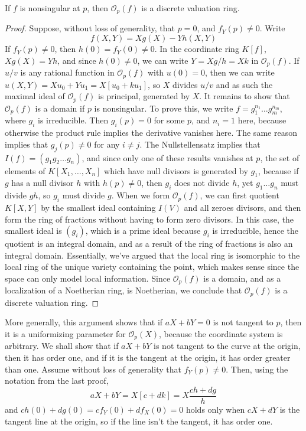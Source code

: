 \begin{theorem}
    If $f$ is nonsingular at $p$, then $\mathcal{O}_p(f)$ is a discrete valuation ring.
\end{theorem}
\begin{proof}
    Suppose, without loss of generality, that $p = 0$, and $f_Y(p) \neq 0$. Write
    \[ f(X,Y) = Xg(X) - Yh(X,Y) \]
    If $f_Y(p) \neq 0$, then $h(0) = f_Y(0) \neq 0$. In the coordinate ring $K[f]$, $Xg(X) = Yh$, and since $h(0) \neq 0$, we can write $Y = Xg/h = Xk$ in $\mathcal{O}_p(f)$. If $u/v$ is any rational function in $\mathcal{O}_p(f)$ with $u(0) = 0$, then we can write $u(X,Y) = Xu_0 + Yu_1 = X[u_0 + ku_1]$, so $X$ divides $u/v$ and as such the maximal ideal of $\mathcal{O}_p(f)$ is principal, generated by $X$. It remains to show that $\mathcal{O}_p(f)$ is a domain if $p$ is nonsingular. To prove this, we write $f = g_1^{n_1} \dots g_m^{n_m}$, where $g_i$ is irreducible. Then $g_i(p) = 0$ for some $p$, and $n_i = 1$ here, because otherwise the product rule implies the derivative vanishes here. The same reason implies that $g_j(p) \neq 0$ for any $i \neq j$. The Nullstellensatz implies that $I(f) = (g_1 g_2 \dots g_n)$, and since only one of these results vanishes at $p$, the set of elements of $K[X_1, \dots, X_n]$ which have null divisors is generated by $g_1$, because if $g$ has a null divisor $h$ with $h(p) \neq 0$, then $g_i$ does not divide $h$, yet $g_1 \dots g_n$ must divide $gh$, so $g_i$ must divide $g$. When we form $\mathcal{O}_p(f)$, we can first quotient $K[X,Y]$ by the smallest ideal containing $I(V)$ and all zeroes divisors, and then form the ring of fractions without having to form zero divisors. In this case, the smallest ideal is $(g_i)$, which is a prime ideal because $g_i$ is irreducible, hence the quotient is an integral domain, and as a result of the ring of fractions is also an integral domain. Essentially, we've argued that the local ring is isomorphic to the local ring of the unique variety containing the point, which  makes sense since the space can only model local information. Since $\mathcal{O}_p(f)$ is a domain, and as a localization of a Noetherian ring, is Noetherian, we conclude that $\mathcal{O}_p(f)$ is a discrete valuation ring.
\end{proof}

\begin{example}
    More generally, this argument shows that if $aX + bY = 0$ is not tangent to $p$, then it is a uniformizing parameter for $\mathcal{O}_p(X)$, because the coordinate system is arbitrary. We shall show that if $aX + bY$ is not tangent to the curve at the origin, then it has order one, and if it is the tangent at the origin, it has order greater than one. Assume without loss of generality that $f_Y(p) \neq 0$. Then, using the notation from the last proof,
    \[ aX + bY = X[c + dk] =  X \frac{ch + dg}{h} \]
    and $ch(0) + dg(0) = cf_Y(0) + df_X(0) = 0$ holds only when $cX + dY$ is the tangent line at the origin, so if the line isn't the tangent, it has order one.
\end{example}

